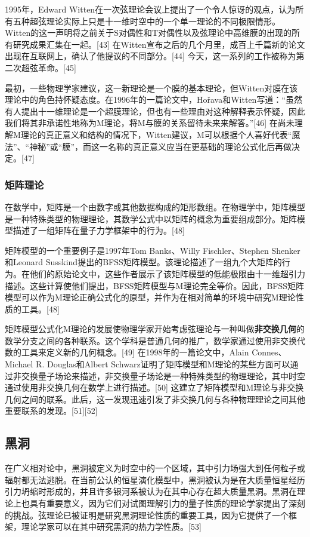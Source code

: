1995年，Edward Witten在一次弦理论会议上提出了一个令人惊讶的观点，认为所有五种超弦理论实际上只是十一维时空中的一个单一理论的不同极限情形。Witten的这一声明将之前关于S对偶性和T对偶性以及弦理论中高维膜的出现的所有研究成果汇集在一起。[43] 在Witten宣布之后的几个月里，成百上千篇新的论文出现在互联网上，确认了他提议的不同部分。[44] 今天，这一系列的工作被称为第二次超弦革命。[45]

最初，一些物理学家建议，这一新理论是一个膜的基本理论，但Witten对膜在该理论中的角色持怀疑态度。在1996年的一篇论文中，Hořava和Witten写道：“虽然有人提出十一维理论是一个超膜理论，但也有一些理由对这种解释表示怀疑，因此我们将其非承诺性地称为M理论，将M与膜的关系留待未来来解答。”[46] 在尚未理解M理论的真正意义和结构的情况下，Witten建议，M可以根据个人喜好代表“魔法”、“神秘”或“膜”，而这一名称的真正意义应当在更基础的理论公式化后再做决定。[47]
\subsubsection{矩阵理论} 
在数学中，矩阵是一个由数字或其他数据构成的矩形数组。在物理学中，矩阵模型是一种特殊类型的物理理论，其数学公式中以矩阵的概念为重要组成部分。矩阵模型描述了一组矩阵在量子力学框架中的行为。[48]

矩阵模型的一个重要例子是1997年Tom Banks、Willy Fischler、Stephen Shenker和Leonard Susskind提出的BFSS矩阵模型。该理论描述了一组九个大矩阵的行为。在他们的原始论文中，这些作者展示了该矩阵模型的低能极限由十一维超引力描述。这些计算使他们提出，BFSS矩阵模型与M理论完全等价。因此，BFSS矩阵模型可以作为M理论正确公式化的原型，并作为在相对简单的环境中研究M理论性质的工具。[48]

矩阵模型公式化M理论的发展使物理学家开始考虑弦理论与一种叫做\textbf{非交换几何}的数学分支之间的各种联系。这个学科是普通几何的推广，数学家通过使用非交换代数的工具来定义新的几何概念。[49] 在1998年的一篇论文中，Alain Connes、Michael R. Douglas和Albert Schwarz证明了矩阵模型和M理论的某些方面可以通过非交换量子场论来描述，非交换量子场论是一种特殊类型的物理理论，其中时空通过使用非交换几何在数学上进行描述。[50] 这建立了矩阵模型和M理论与非交换几何之间的联系。此后，这一发现迅速引发了非交换几何与各种物理理论之间其他重要联系的发现。[51][52]
\subsection{黑洞}  
在广义相对论中，黑洞被定义为时空中的一个区域，其中引力场强大到任何粒子或辐射都无法逃脱。在当前公认的恒星演化模型中，黑洞被认为是在大质量恒星经历引力坍缩时形成的，并且许多银河系被认为在其中心存在超大质量黑洞。黑洞在理论上也具有重要意义，因为它们对试图理解引力的量子性质的理论学家提出了深刻的挑战。弦理论已被证明是研究黑洞理论性质的重要工具，因为它提供了一个框架，理论学家可以在其中研究黑洞的热力学性质。[53]
